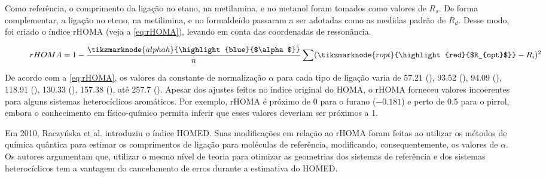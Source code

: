 Como referência, o comprimento da ligação  no etano,  na metilamina, e  no metanol foram tomados como valores de $R_s$. De forma complementar, a ligação  no eteno,  na metilimina, e  no formaldeído passaram a ser adotadas como as medidas padrão de $R_d$. Desse modo, foi criado o índice \gls{rHOMA} (veja a \autoref{eq:rHOMA}), levando em conta das coordenadas de ressonância.


\begin{figure}[htb]
    \vspace{2\baselineskip}
\begin{equation}
    \label{eq:rHOMA}
    rHOMA = 1 - \frac{\tikzmarknode{alphah}{\highlight{blue}{$\alpha$}}}{n} \sum (\tikzmarknode{ropt}{\highlight{red}{$R_{opt}$}} - R_i)^2
\end{equation}
\vspace{2\baselineskip}
\end{figure}

De acordo com a \autoref{eq:rHOMA}, os valores da constante de normalização $\alpha$ para cada tipo de ligação varia de 57.21 (), 93.52 (), 94.09 (), 118.91 (), 130.33 (), 157.38 (), até 257.7 (). Apesar dos ajustes feitos no índice original do \gls{HOMA}, o \gls{rHOMA} forneceu valores incoerentes para alguns sistemas heterocíclicos aromáticos. Por exemplo, \gls{rHOMA} é próximo de 0 para o furano ($-0.181$) e perto de 0.5 para o pirrol, embora o conhecimento em físico-químico permita inferir que esses valores deveriam ser próximos a 1.

Em 2010, Raczyńska et al.\autocite{Raczyska2010} introduziu o índice \gls{HOMED}. Suas modificações em relação ao \gls{rHOMA} foram feitas ao utilizar os métodos de química quântica para estimar os comprimentos de ligação para moléculas de referência, modificando, consequentemente, os valores de $\alpha$. Os autores argumentam que, utilizar o mesmo nível de teoria para otimizar as geometrias dos sistemas de referência e dos sistemas heterocíclicos tem a vantagem do cancelamento de erros durante a estimativa do HOMED.

